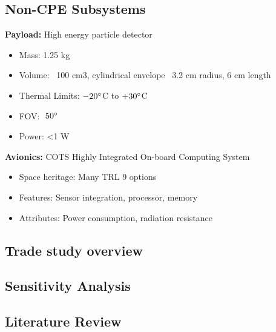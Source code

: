 \documentclass[3p]{elsarticle}
\begin{document}

\subsection{Non-CPE Subsystems}
\noindent\textbf{Payload:} High energy particle detector
\begin{itemize}
    \item Mass: 1.25 kg
    \item Volume: ~100 cm3, cylindrical envelope ~3.2 cm radius, 6 cm length
    \item Thermal Limits: $-20\degree$C to $+30\degree$C
    \item FOV: $~50\degree$
    \item Power: <1 W
\end{itemize}

\noindent\textbf{Avionics:} COTS Highly Integrated On-board Computing System
\begin{itemize}
    \item Space heritage: Many TRL 9 options
    \item Features: Sensor integration, processor, memory
    \item Attributes: Power consumption, radiation resistance
\end{itemize}


\subsection{Trade study overview}
\subsection{Sensitivity Analysis}
\subsection{Literature Review}
\end{document}
